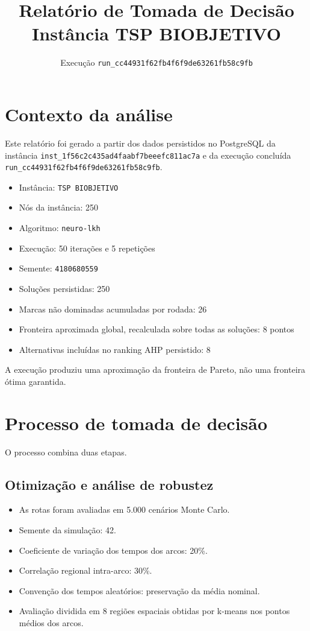 \documentclass[12pt,a4paper]{article}
\title{\textbf{Relatório de Tomada de Decisão}\\[0.4em]
\large Instância TSP BIOBJETIVO}
\author{Execução \texttt{run\_cc44931f62fb4f6f9de63261fb58c9fb}}
\date{}
\begin{document}
\maketitle

\section*{Contexto da análise}

Este relatório foi gerado a partir dos dados persistidos no PostgreSQL da instância
\texttt{inst\_1f56c2c435ad4faabf7beeefc811ac7a} e da execução concluída
\texttt{run\_cc44931f62fb4f6f9de63261fb58c9fb}.

\begin{itemize}[leftmargin=*]
  \item Instância: \texttt{TSP BIOBJETIVO}
  \item Nós da instância: 250
  \item Algoritmo: \texttt{neuro-lkh}
  \item Execução: 50 iterações e 5 repetições
  \item Semente: \texttt{4180680559}
  \item Soluções persistidas: 250
  \item Marcas não dominadas acumuladas por rodada: 26
  \item Fronteira aproximada global, recalculada sobre todas as soluções: 8 pontos
  \item Alternativas incluídas no ranking AHP persistido: 8
\end{itemize}

A execução produziu uma aproximação da fronteira de Pareto, não uma fronteira ótima garantida.

\section{Processo de tomada de decisão}

O processo combina duas etapas.

\subsection{Otimização e análise de robustez}

\begin{itemize}[leftmargin=*]
  \item As rotas foram avaliadas em 5.000 cenários Monte Carlo.
  \item Semente da simulação: 42.
  \item Coeficiente de variação dos tempos dos arcos: 20\%.
  \item Correlação regional intra-arco: 30\%.
  \item Convenção dos tempos aleatórios: preservação da média nominal.
  \item Avaliação dividida em 8 regiões espaciais obtidas por k-means nos pontos médios dos arcos.
\end{itemize}
\end{document}
